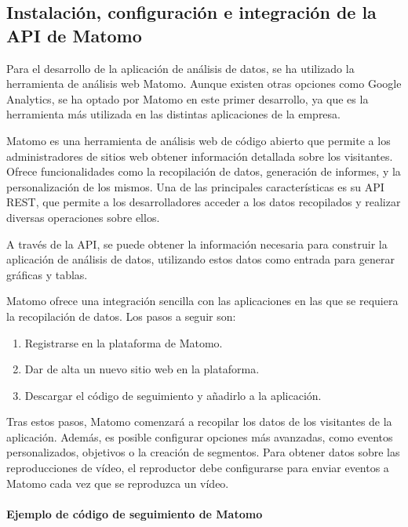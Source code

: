 \subsection{Instalación, configuración e integración de la API de Matomo}
\label{sec:configuracion-matomo}

Para el desarrollo de la aplicación de análisis de datos, se ha utilizado la herramienta de análisis web Matomo. Aunque existen 
otras opciones como Google Analytics, se ha optado por Matomo en este primer desarrollo, ya que es la herramienta más utilizada 
en las distintas aplicaciones de la empresa.

Matomo \cite{matomo} es una herramienta de análisis web de código abierto que permite a los administradores de sitios web 
obtener información detallada sobre los visitantes. Ofrece funcionalidades como la recopilación de datos, generación de informes, 
y la personalización de los mismos. Una de las principales características es su API REST, que permite a los desarrolladores 
acceder a los datos recopilados y realizar diversas operaciones sobre ellos.

A través de la API, se puede obtener la información necesaria para construir la aplicación de análisis de datos, utilizando estos 
datos como entrada para generar gráficas y tablas.

Matomo ofrece una integración sencilla con las aplicaciones en las que se requiera la recopilación de datos. Los pasos a seguir son:

\begin{enumerate}
    \item Registrarse en la plataforma de Matomo.
    \item Dar de alta un nuevo sitio web en la plataforma.
    \item Descargar el código de seguimiento y añadirlo a la aplicación.
\end{enumerate}

Tras estos pasos, Matomo comenzará a recopilar los datos de los visitantes de la aplicación. Además, es posible configurar opciones 
más avanzadas, como eventos personalizados, objetivos o la creación de segmentos. Para obtener datos sobre las reproducciones de vídeo, 
el reproductor debe configurarse para enviar eventos a Matomo cada vez que se reproduzca un vídeo.

\paragraph{Ejemplo de código de seguimiento de Matomo}

